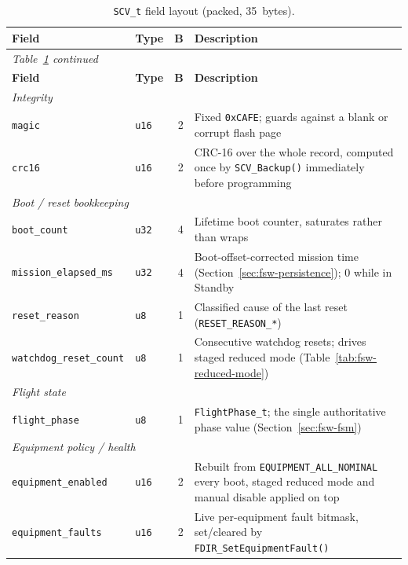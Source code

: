 \begin{longtable}{@{}llr p{6.0cm}@{}}
\caption{\texttt{SCV\_t} field layout (packed, 35~bytes).}
\label{tab:fsw-scv-fields}\\
\toprule
\textbf{Field} & \textbf{Type} & \textbf{B} & \textbf{Description} \\
\midrule
\endfirsthead
\multicolumn{4}{l}{\small\itshape Table~\ref{tab:fsw-scv-fields} continued}\\
\toprule
\textbf{Field} & \textbf{Type} & \textbf{B} & \textbf{Description} \\
\midrule
\endhead
\multicolumn{4}{l}{\textit{Integrity}}\\
\texttt{magic}                     & \texttt{u16} & 2 & Fixed \texttt{0xCAFE}; guards against a blank or corrupt flash page \\
\texttt{crc16}                     & \texttt{u16} & 2 & CRC-16 over the whole record, computed once by \texttt{SCV\_Backup()} immediately before programming \\
\midrule
\multicolumn{4}{l}{\textit{Boot / reset bookkeeping}}\\
\texttt{boot\_count}               & \texttt{u32} & 4 & Lifetime boot counter, saturates rather than wraps \\
\texttt{mission\_elapsed\_ms}      & \texttt{u32} & 4 & Boot-offset-corrected mission time (Section~\ref{sec:fsw-persistence}); 0 while in Standby \\
\texttt{reset\_reason}             & \texttt{u8}  & 1 & Classified cause of the last reset (\texttt{RESET\_REASON\_*}) \\
\texttt{watchdog\_reset\_count}    & \texttt{u8}  & 1 & Consecutive watchdog resets; drives staged reduced mode (Table~\ref{tab:fsw-reduced-mode}) \\
\midrule
\multicolumn{4}{l}{\textit{Flight state}}\\
\texttt{flight\_phase}             & \texttt{u8}  & 1 & \texttt{FlightPhase\_t}; the single authoritative phase value (Section~\ref{sec:fsw-fsm}) \\
\midrule
\multicolumn{4}{l}{\textit{Equipment policy / health}}\\
\texttt{equipment\_enabled}        & \texttt{u16} & 2 & Rebuilt from \texttt{EQUIPMENT\_ALL\_NOMINAL} every boot, staged reduced mode and manual disable applied on top \\
\texttt{equipment\_faults}         & \texttt{u16} & 2 & Live per-equipment fault bitmask, set/cleared by \texttt{FDIR\_SetEquipmentFault()} \\

\end{longtable}
